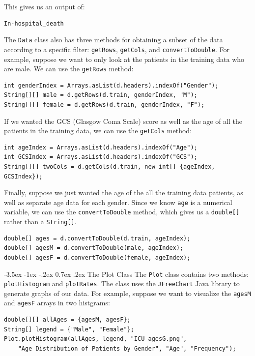 \documentclass{article}
\makeatletter
\renewcommand{\section}{\@startsection{section}{1}{\z@}%
    {-3.5ex \@plus -1ex \@minus -.2ex}%
    {0.7ex \@plus.2ex}%
    {\normalfont\Large\bfseries}}
\makeatother
\begin{document}
This gives us an output of: 
\begin{lstlisting}
In-hospital_death
\end{lstlisting}

The \verb|Data| class also has three methods for obtaining a subset of the data according to a specific filter: \verb|getRows|, \verb|getCols|, and \verb|convertToDouble|. For example, suppose we want to only look at the patients in the training data who are male. We can use the \verb|getRows| method: 

\begin{lstlisting}
int genderIndex = Arrays.asList(d.headers).indexOf("Gender");
String[][] male = d.getRows(d.train, genderIndex, "M");
String[][] female = d.getRows(d.train, genderIndex, "F");
\end{lstlisting}

If we wanted the GCS (Glasgow Coma Scale) score as well as the age of all the patients in the training data, we can use the \verb|getCols| method:

\begin{lstlisting}
int ageIndex = Arrays.asList(d.headers).indexOf("Age");
int GCSIndex = Arrays.asList(d.headers).indexOf("GCS");
String[][] twoCols = d.getCols(d.train, new int[] {ageIndex, GCSIndex});
\end{lstlisting}

Finally, suppose we just wanted the age of the all the training data patients, as well as separate age data for each gender. Since we know \verb|age| is a numerical variable, we can use the \verb|convertToDouble| method, which gives us a \verb|double[]| rather than a \verb|String[]|.

\begin{lstlisting}
double[] ages = d.convertToDouble(d.train, ageIndex);
double[] agesM = d.convertToDouble(male, ageIndex);
double[] agesF = d.convertToDouble(female, ageIndex);
\end{lstlisting}

\section{The Plot Class}
The \verb|Plot| class contains two methods: \verb|plotHistogram| and \verb|plotRates|. The class uses the \verb|JFreeChart| Java library to generate graphs of our data. For example, suppose we want to visualize the \verb|agesM| and \verb|agesF| arrays in two histgrams:

\begin{lstlisting}
double[][] allAges = {agesM, agesF};
String[] legend = {"Male", "Female"};
Plot.plotHistogram(allAges, legend, "ICU_agesG.png", 
	"Age Distribution of Patients by Gender", "Age", "Frequency");
\end{lstlisting}
\end{document}
